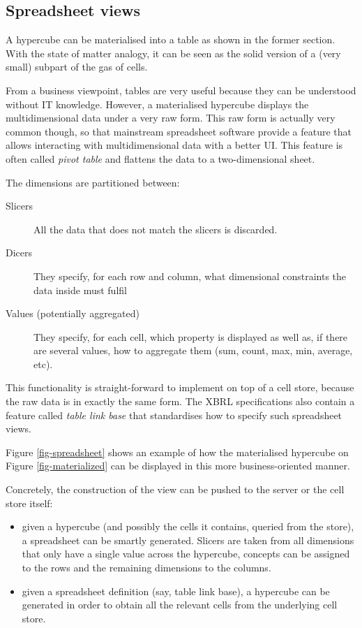 \documentclass{vldb}
\begin{document}
\subsection{Spreadsheet views}

A hypercube can be materialised into a table as shown in the former section. With the state of matter analogy, it can be seen as the solid version of a (very small) subpart of the gas of cells.

From a business viewpoint, tables are very useful because they can be understood without IT knowledge. However, a materialised hypercube displays the multidimensional data under a very raw form. This raw form is actually very common though, so that mainstream spreadsheet software provide a feature that allows interacting with multidimensional data with a better UI. This feature is often called \emph{pivot table} and flattens the data to a two-dimensional sheet.

The dimensions are partitioned between:
\begin{description}
\item [Slicers] All the data that does not match the slicers is discarded.
\item [Dicers] They specify, for each row and column, what dimensional constraints the data inside must fulfil
\item [Values (potentially aggregated)] They specify, for each cell, which property is displayed as well as, if there are several values, how to aggregate them (sum, count, max, min, average, etc).
\end{description}

This functionality is straight-forward to implement on top of a cell store, because the raw data is in exactly the same form. The XBRL specifications also contain a feature called \emph{table link base} that standardises how to specify such spreadsheet views.

Figure \ref{fig-spreadsheet} shows an example of how the materialised hypercube on Figure \ref{fig-materialized} can be displayed in this more business-oriented manner.

Concretely, the construction of the view can be pushed to the server or the cell store itself:

\begin{itemize}
\item given a hypercube (and possibly the cells it contains, queried from the store), a spreadsheet can be smartly generated. Slicers are taken from all dimensions that only have a single value across the hypercube, concepts can be assigned to the rows and the remaining dimensions to the columns.
\item given a spreadsheet definition (say, table link base), a hypercube can be generated in order to obtain all the relevant cells from the underlying cell store.
\end{itemize}
\end{document}
